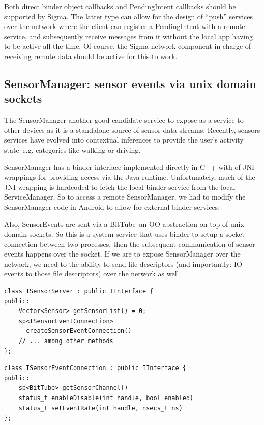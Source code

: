 \documentclass[prodmode]{acmlarge}
\begin{document}
Both direct binder object callbacks and PendingIntent callbacks should be supported by Sigma. The latter type can allow for the design of ``push'' services over the network where the client can register a PendingIntent with a remote service, and subsequently receive messages from it without the local app having to be active all the time. Of course, the Sigma network component in charge of receiving remote data should be active for this to work.

\subsection{SensorManager: sensor events via unix domain sockets}
The SensorManager another good candidate service to expose as a service to other devices as it is a standalone source of sensor data streams. Recently, sensors services have evolved into contextual inferences to provide the user's activity state--e.g. categories like walking or driving.

SensorManager has a binder interface implemented directly in C++ with of JNI wrappings for providing access via the Java runtime. Unfortunately, much of the JNI wrapping is hardcoded to fetch the local binder service from the local ServiceManager. So to access a remote SensorManager, we had to modify the SensorManager code in Android to allow for external binder services.

Also, SensorEvents are sent via a BitTube--an OO abstraction on top of unix domain sockets. So this is a system service that uses binder to setup a socket connection between two processes, then the subsequent communication of sensor events happens over the socket. If we are to expose SensorManager over the network, we need to the ability to send file descriptors (and importantly: IO events to those file descriptors) over the network as well.

\begin{Verbatim}[samepage=true]
class ISensorServer : public IInterface {
public:
    Vector<Sensor> getSensorList() = 0;
    sp<ISensorEventConnection>
      createSensorEventConnection()
    // ... among other methods
};
\end{Verbatim}

\begin{Verbatim}[samepage=true]
class ISensorEventConnection : public IInterface {
public:
    sp<BitTube> getSensorChannel()
    status_t enableDisable(int handle, bool enabled)
    status_t setEventRate(int handle, nsecs_t ns)
};
\end{Verbatim}
\end{document}
